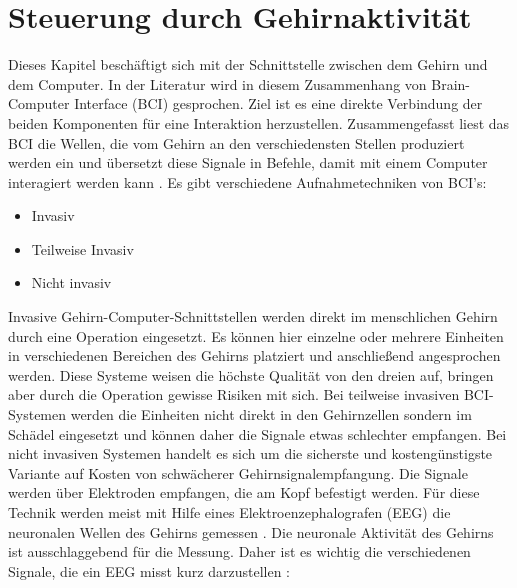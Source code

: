 \section{Steuerung durch Gehirnaktivität}

Dieses Kapitel beschäftigt sich mit der Schnittstelle zwischen dem Gehirn und dem Computer. In der Literatur wird in diesem Zusammenhang von Brain-Computer Interface (BCI) gesprochen. Ziel ist es eine direkte Verbindung der beiden Komponenten für eine Interaktion herzustellen. Zusammengefasst liest das BCI die Wellen, die vom Gehirn an den verschiedensten Stellen produziert werden ein und übersetzt diese Signale in Befehle, damit mit einem Computer interagiert werden kann \cite{BRAIN}.
\newline \newline
Es gibt verschiedene Aufnahmetechniken von BCI's:
\begin{itemize}
      \item Invasiv
      \item Teilweise Invasiv
			\item Nicht invasiv
\end{itemize}
\newline
Invasive Gehirn-Computer-Schnittstellen werden direkt im menschlichen Gehirn durch eine Operation eingesetzt. Es können hier einzelne oder mehrere Einheiten in verschiedenen Bereichen des Gehirns platziert und anschließend angesprochen werden. Diese Systeme weisen die höchste Qualität von den dreien auf, bringen aber durch die Operation gewisse Risiken mit sich.
Bei teilweise invasiven BCI-Systemen werden die Einheiten nicht direkt in den Gehirnzellen sondern im Schädel eingesetzt und können daher die Signale etwas schlechter empfangen. Bei nicht invasiven Systemen handelt es sich um die sicherste und kostengünstigste Variante auf Kosten von schwächerer Gehirnsignalempfangung. Die Signale werden über Elektroden empfangen, die am Kopf befestigt werden. Für diese Technik werden meist mit Hilfe eines Elektroenzephalografen (EEG) die neuronalen Wellen des Gehirns gemessen \cite{BRAIN}.
\newline \newline
Die neuronale Aktivität des Gehirns ist ausschlaggebend für die Messung. Daher ist es wichtig die verschiedenen Signale, die ein EEG misst kurz darzustellen \cite{BRAIN}:
